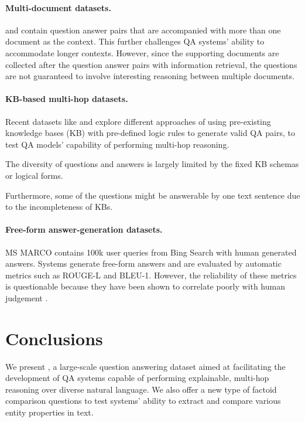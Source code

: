 \paragraph{Multi-document datasets.} \triviaqa{} \cite{Joshi2017TriviaQA} and \searchqa{} \cite{dunn2017searchqa} contain question answer pairs that are accompanied with more than one document as the context. This further challenges QA systems' ability to accommodate longer contexts. However, since the supporting documents are collected after the question answer pairs with information retrieval, the questions are not guaranteed to involve interesting reasoning between multiple documents.

\paragraph{KB-based multi-hop datasets.} Recent datasets like
\wikihop{} \cite{welbl2017constructing} and \complexwebq{} \cite{talmor2018web} explore different approaches of using pre-existing knowledge bases (KB) with pre-defined logic rules to generate valid QA pairs, to test QA models' capability of performing multi-hop reasoning.

The diversity of questions and answers is largely limited by the fixed KB schemas or logical forms.

Furthermore, some of the questions might be answerable by one text sentence due to the incompleteness of KBs.

\paragraph{Free-form answer-generation datasets.} MS MARCO \cite{nguyen2016ms} contains 100k user queries from Bing Search with human generated answers. Systems generate free-form answers and are evaluated by automatic metrics such as ROUGE-L and BLEU-1. However, the reliability of these metrics is questionable because they have been shown to correlate poorly with human judgement \cite{novikova2017we}.

\section{Conclusions}

We present \datasetname{}, a large-scale question answering dataset aimed at facilitating the development of QA systems capable of performing explainable, multi-hop reasoning over diverse natural language. We also offer a new type of factoid comparison questions to test systems' ability to extract and compare various entity properties in text.


